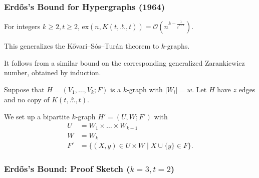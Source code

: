 \documentclass{beamer}
\newcommand{\ex}[2]{\ensuremath{\text{ex} \left( #1, #2 \right)}}
\newcommand{\compoverset}[2]{\ensuremath{K\left(#2, \overset{#1}{\dots}, #2\right)}} %
\newcommand{\bigO}[1]{\ensuremath{\mathcal{O}\left(#1\right)}}
\theoremstyle{mystyle}
\begin{document}
\begin{frame}
    \frametitle{Erd\H{o}s's Bound for Hypergraphs (1964)}

    \begin{theorem}[Erd\H{o}s '64]
        For integers $k \ge 2, t \ge 2$,
        $\ex{n}{\compoverset{k}{t}} = \bigO{n^{k - \frac{1}{t^{k-1}}}}.$
    \end{theorem}

    This generalizes the Kővari--Sós--Turán theorem to $k$-graphs.

    It follows from a similar bound on the corresponding generalized Zarankiewicz number,
    obtained by induction.

    Suppose that $H = (V_1, \dots, V_k; F)$ is a $k$-graph with $|W_i| = w$.
    Let $H$ have $z$ edges and no copy of $\compoverset{k}{t}$.

    We set up a bipartite $k$-graph $H' = (U, W; F')$ with
    \begin{align*}
        U &=  W_1 \times \dots \times W_{k-1} \\
        W &= W_k \\
        F' &= \{(X, y) \in U \times W \mid X \cup \{y\} \in F\}.
    \end{align*}

\end{frame}

\begin{frame}[fragile]
    \frametitle{Erd\H{o}s's Bound: Proof Sketch ($k=3, t=2$)}

    \begin{figure}
        \centering
        \scalebox{0.55}{
            
        }\label{fig:erdos64_sketch}
    \end{figure}

\end{frame}
\end{document}
